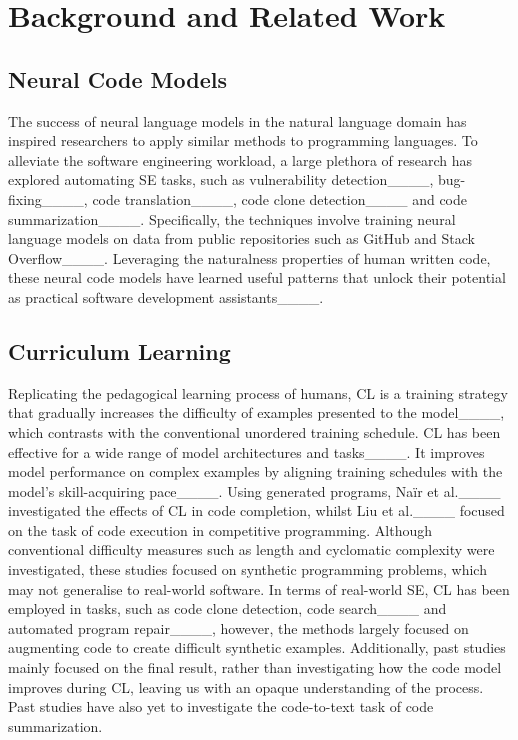 \section{Background and Related Work}
\subsection{Neural Code Models}
The success of neural language models in the natural language domain has inspired researchers to apply similar methods to programming languages. 
To alleviate the software engineering workload, a large plethora of research has explored automating SE tasks, such as vulnerability detection____, bug-fixing____, code translation____, code clone detection____ and code summarization____. 
Specifically, the techniques involve training neural language models on data from public repositories such as GitHub and Stack Overflow____.
Leveraging the naturalness properties of human written code, these neural code models have learned useful patterns that unlock their potential as practical software development assistants____.

\subsection{Curriculum Learning}

Replicating the pedagogical learning process of humans, CL is a training strategy that gradually increases the difficulty of examples presented to the model____, which contrasts with the conventional unordered training schedule.
CL has been effective for a wide range of model architectures and tasks____. 
It improves model performance on complex examples by aligning training schedules with the model's skill-acquiring pace____.
Using generated programs, Naïr et al.____ investigated the effects of CL in code completion, whilst Liu et al.____ focused on the task of code execution in competitive programming.
Although conventional difficulty measures such as length and cyclomatic complexity were investigated, these studies focused on synthetic programming problems, which may not generalise to real-world software.
In terms of real-world SE, CL has been employed in tasks, such as code clone detection, code search____ and automated program repair____, however, the methods largely focused on augmenting code to create difficult synthetic examples.
Additionally, past studies mainly focused on the final result, rather than investigating how the code model improves during CL, leaving us with an opaque understanding of the process.
Past studies have also yet to investigate the code-to-text task of code summarization.